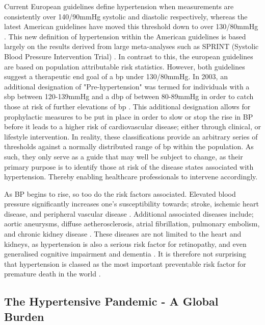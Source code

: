 Current European guidelines define hypertension when measurements are consistently over 140/90mmHg systolic and diastolic respectively, whereas the latest American guidelines have moved this threshold down to over 130/80mmHg \cite{Williams2018,Whelton2018}. This new definition of hypertension within the American guidelines is based largely on the results derived from large meta-analyses such as SPRINT (Systolic Blood Pressure Intervention Trial) \cite{doi:10.1056/NEJMoa1511939}. In contrast to this, the european guidelines are based on population attributable risk statistics. However, both guidelines suggest a therapeutic end goal of a \acrshort{bp} under 130/80mmHg. In 2003, an additional designation of "Pre-hypertension" was termed for individuals with a \acrfull{sbp} between 120-139mmHg and a \acrfull{dbp} of between 80-89mmHg in order to catch those at risk of further elevations of \acrshort{bp} \cite{Chobanian2003}. This additional designation allows for prophylactic measures to be put in place in order to slow or stop the rise in BP before it leads to a higher risk of cardiovascular disease; either through clinical, or lifestyle intervention. In reality, these classifications provide an arbitrary series of thresholds against a normally distributed range of \acrshort{bp} within the population. As such, they only serve as a guide that may well be subject to change, as their primary purpose is to identify those at risk of the disease states associated with hypertension. Thereby enabling healthcare professionals to intervene accordingly. 

As BP begins to rise, so too do the risk factors associated. Elevated blood pressure significantly increases one's susceptibility towards; stroke, ischemic heart disease, and peripheral vascular disease \cite{Lewington2002,Dickinson2003,Singer2008}. Additional associated diseases include; aortic aneurysms, diffuse aetherosclerosis, atrial fibrillation, pulmonary embolism, and chronic kidney disease \cite{Lau2017,Tracy2002}. These diseases are not limited to the heart and kidneys, as hypertension is also a serious risk factor for retinopathy, and even generalised cognitive impairment and dementia \cite{Tzourio2007,Jenkins2015}. It is therefore not surprising that hypertension is classed as the most important preventable risk factor for premature death in the world \cite{who2009}. 

\subsection{The Hypertensive Pandemic - A Global Burden}

